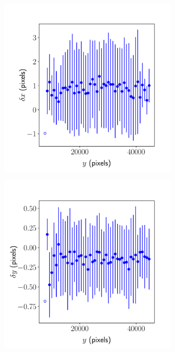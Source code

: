 \documentclass{article}
\begin{document}
\begin{figure}[ht]
\begin{subfigure}{0.24\linewidth}
		\caption{}
		\label{fig:sinewave4yx1}
	\end{subfigure}
	\begin{subfigure}{0.24\linewidth}
		\includegraphics[width=\linewidth]{sine-wave-4-xy-1.pdf}
		\caption{}
		\label{fig:sinewave4xy1}
	\end{subfigure}
	\begin{subfigure}{0.24\linewidth}
		\includegraphics[width=\linewidth]{sine-wave-4-yy-1.pdf}

\end{subfigure}
\end{figure}
\end{document}
